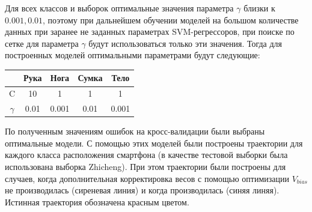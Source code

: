 \documentclass{article}
\begin{document}
Для всех классов и выборок оптимальные значения параметра $\gamma$ близки к $0.001, 0.01$, поэтому при дальнейшем обучении моделей на большом количестве данных при заранее не заданных параметрах SVM-регрессоров, при поиске по сетке для параметра $\gamma$ будут использоваться только эти значения. Тогда для построенных моделей оптимальными параметрами будут следующие:

\begin{table}[H]
\begin{center}
\begin{tabular}{|c|c|c|c|c|}
\hline
& Рука & Нога & Сумка & Тело \\
\hline
C & 10 & 1 & 1 & 1 \\
\hline
$\gamma$ & 0.01 & 0.001 & 0.01 & 0.001\\
\hline
\end{tabular}
\end{center}
\end{table} 
    

По полученным значениям ошибок на кросс-валидации были выбраны оптимальные модели. С помощью этих моделей были построены траектории для каждого класса расположения смартфона (в качестве тестовой выборки была использована выборка Zhicheng). При этом траектории были построены для случаев, когда дополнительная корректировка весов с помощью оптимизации $V_{bias}$ не производилась (сиреневая линия) и когда производилась (синяя линяя). Истинная траектория обозначена красным цветом.
\end{document}
